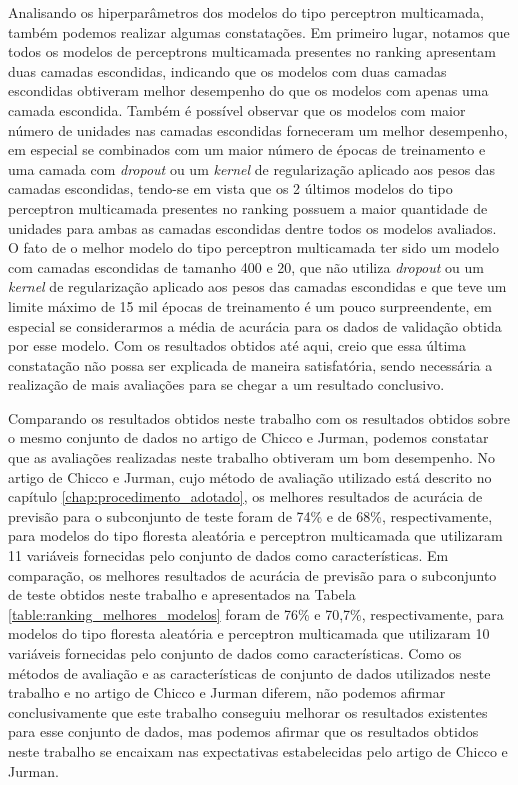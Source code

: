 Analisando os hiperparâmetros dos modelos do tipo perceptron multicamada, também podemos realizar algumas constatações. Em primeiro lugar, notamos que todos os modelos de perceptrons multicamada presentes no ranking apresentam duas camadas escondidas, indicando que os modelos com duas camadas escondidas obtiveram melhor desempenho do que os modelos com apenas uma camada escondida. Também é possível observar que os modelos com maior número de unidades nas camadas escondidas forneceram um melhor desempenho, em especial se combinados com um maior número de épocas de treinamento e uma camada com \textit{dropout} ou um \textit{kernel} de regularização aplicado aos pesos das camadas escondidas, tendo-se em vista que os 2 últimos modelos do tipo perceptron multicamada presentes no ranking possuem a maior quantidade de unidades para ambas as camadas escondidas dentre todos os modelos avaliados. O fato de o melhor modelo do tipo perceptron multicamada ter sido um modelo com camadas escondidas de tamanho 400 e 20, que não utiliza \textit{dropout} ou um \textit{kernel} de regularização aplicado aos pesos das camadas escondidas e que teve um limite máximo de 15 mil épocas de treinamento é um pouco surpreendente, em especial se considerarmos a média de acurácia para os dados de validação obtida por esse modelo. Com os resultados obtidos até aqui, creio que essa última constatação não possa ser explicada de maneira satisfatória, sendo necessária a realização de mais avaliações para se chegar a um resultado conclusivo.

Comparando os resultados obtidos neste trabalho com os resultados obtidos sobre o mesmo conjunto de dados no artigo de Chicco e Jurman, podemos constatar que as avaliações realizadas neste trabalho obtiveram um bom desempenho. No artigo de Chicco e Jurman, cujo método de avaliação utilizado está descrito no capítulo \ref{chap:procedimento_adotado}, os melhores resultados de acurácia de previsão para o subconjunto de teste foram de 74\% e de 68\%, respectivamente, para modelos do tipo floresta aleatória e perceptron multicamada que utilizaram 11 variáveis fornecidas pelo conjunto de dados como características. Em comparação, os melhores resultados de acurácia de previsão para o subconjunto de teste obtidos neste trabalho e apresentados na Tabela \ref{table:ranking_melhores_modelos} foram de 76\% e 70,7\%, respectivamente, para modelos do tipo floresta aleatória e perceptron multicamada que utilizaram 10 variáveis fornecidas pelo conjunto de dados como características. Como os métodos de avaliação e as características de conjunto de dados utilizados neste trabalho e no artigo de Chicco e Jurman diferem, não podemos afirmar conclusivamente que este trabalho conseguiu melhorar os resultados existentes para esse conjunto de dados, mas podemos afirmar que os resultados obtidos neste trabalho se encaixam nas expectativas estabelecidas pelo artigo de Chicco e Jurman.

